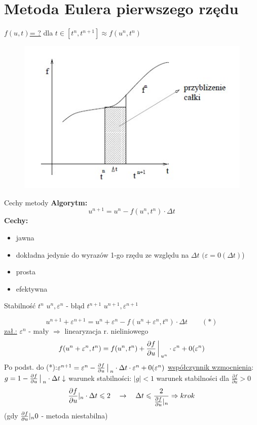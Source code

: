 \section{Metoda Eulera pierwszego rzędu}
\begin{frame}
  \underline{$f(u,t)$= ?} \quad dla  \quad $t \in [t^n,t^{n+1}] \approx f(u^n,t^n)$
  \begin{figure}
	\includegraphics[height=0.65\textheight]{img/img1.jpg}
	\end{figure}
\end{frame}
\begin{frame}{Cechy metody}
  \textbf{Algorytm:}
  $$u^{n+1} = u^n - f(u^n, t^n) \cdot \Delta t$$
  \textbf{Cechy:}
  \begin{itemize}
    \item jawna
    \item dokładna jedynie do wyrazów 1-go rzędu ze względu na $\Delta t$ \quad $(\varepsilon=0(\Delta t)$)
    \item prosta
    \item efektywna
  \end{itemize}
\end{frame}
\begin{frame}{Stabilność}
  $t^n$ \quad $u^n, \varepsilon^n$ - błąd \qquad
  $t^{n+1}$ \quad $u^{n+1}, \varepsilon^{n+1}$ 

  $$u^{n+1} + \varepsilon^{n+1} = u^n+\varepsilon^n-f(u^n+\varepsilon^n,t^n)\cdot \Delta t \qquad(*)$$
  \underline{zał.:} $\varepsilon^n$ - mały $\Rightarrow$ linearyzacja r. nieliniowego
  $$f(u^n+\varepsilon^n,t^n) = f(u^n,t^n)+\frac{\partial f}{\partial u}{\bigg\arrowvert}_{u^n} \cdot \varepsilon^n+0(\varepsilon^n)$$
  Po podst. do (*):\qquad $\varepsilon^{n+1} = \varepsilon^n-\frac{\partial f}{\partial u}\big\arrowvert_n \cdot \Delta t \cdot \varepsilon^n +0(\varepsilon^n)$ \newline
  \underline{współczynnik wzmocnienia}:\qquad $g = 1- \frac{\partial f}{\partial u}{\big\arrowvert}_n \cdot \Delta t\downarrow$
  warunek stabilności: $|g|<1$ warunek stabilności dla $\frac{\partial f}{\partial u}>0$
  $$\frac{\partial f}{\partial u}\arrowvert_n \cdot \Delta t \leqslant 2 \quad 
  \rightarrow \quad \Delta t \leqslant \frac{2}{\frac{\partial f}{\partial u}\arrowvert_n} \Rightarrow krok$$
  (gdy $\frac{\partial f}{\partial u}\arrowvert_n 0$ - metoda niestabilna)
\end{frame}
